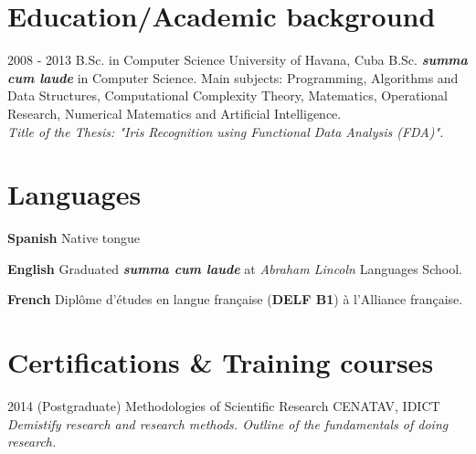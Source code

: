 \documentclass[]{friggeri-cv}
\begin{document}
\pagebreak

\section{Education/Academic background}
\begin{entrylist}

  \entry
    {2008 - 2013}
    {B.Sc. in Computer Science}
    {University of Havana, Cuba}
    {B.Sc. \textbf{\emph{summa cum laude}} in Computer Science. Main subjects: Programming, Algorithms and Data Structures, Computational Complexity Theory, Matematics, Operational Research, Numerical Matematics and Artificial Intelligence.\\
    \emph{Title of the Thesis: "Iris Recognition using Functional Data Analysis (FDA)".}}

\end{entrylist}

\section{Languages}
\begin{entrylist}
  \entry
    {\textbf{Spanish}}
    {}
    {}
    {Native tongue}      

  \entry
    {\textbf{English}}
    {}
    {}
    {Graduated \textbf{\emph{summa cum laude}} at \emph{Abraham Lincoln} Languages School.}

  \entry
    {\textbf{French}}
    {}
    {}
    {Diplôme d'études en langue française (\textbf{DELF B1}) à l'Alliance française.}
\end{entrylist}

\section{Certifications \& Training courses}
\begin{entrylist}
  \entry
    {2014}
    {(Postgraduate) Methodologies of Scientific Research}
    {CENATAV, IDICT}
    {\emph{Demistify research and research methods. Outline of the fundamentals of doing research.}}
\end{entrylist}
\end{document}
